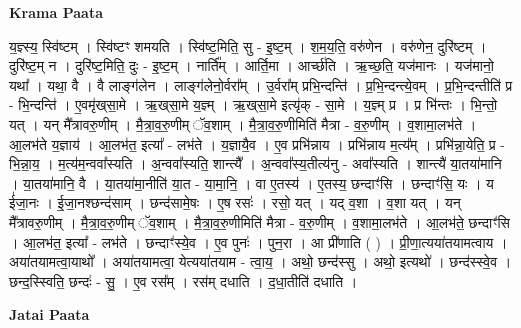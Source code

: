 \documentclass[17pt]{extarticle}
\begin{document}
\textbf{Krama Paata} \newline

य॒ज्ञ्स्य॒ स्वि॑ष्टम् । स्वि॑ष्टꣳ शमयति । स्वि॑ष्ट॒मिति॒ सु - इ॒ष्ट॒म् । श॒म॒य॒ति॒ वरु॑णेन । वरु॑णेन॒ दुरि॑ष्टम् । दुरि॑ष्ट॒म् न । दुरि॑ष्ट॒मिति॒ दुः - इ॒ष्ट॒म् । नार्ति᳚म् । आर्ति॒मा । आर्च्छ॑ति । ऋ॒च्छ॒ति॒ यज॑मानः । यज॑मानो॒ यथा᳚ । यथा॒ वै । वै लाङ्‍ग॑लेन । लाङ्‍ग॑लेनो॒र्वरा᳚म् । उ॒र्वरा᳚म् प्रभि॒न्दन्ति॑ । प्र॒भि॒न्दन्त्ये॒वम् । प्र॒भि॒न्दन्तीति॑ प्र - भि॒न्दन्ति॑ । ए॒वमृ॑ख्‌सा॒मे । ऋ॒ख्‌सा॒मे य॒ज्ञ्म् । ऋ॒ख्‌सा॒मे इत्यृ॑क् - सा॒मे । य॒ज्ञ्म् प्र । प्र भि॑न्तः । भि॒न्तो॒ यत् । यन् मै᳚त्रावरु॒णीम् । मै॒त्रा॒व॒रु॒णीम् ॅव॒शाम् । मै॒त्रा॒व॒रु॒णीमिति॑ मैत्रा - व॒रु॒णीम् । व॒शामा॒लभ॑ते । आ॒लभ॑ते य॒ज्ञाय॑ । आ॒लभ॑त॒ इत्या᳚ - लभ॑ते । य॒ज्ञायै॒व । ए॒व प्रभि॑न्नाय । प्रभि॑न्नाय म॒त्य᳚म् । प्रभि॑न्ना॒येति॒ प्र - भि॒न्ना॒य॒ । म॒त्य॑म॒न्ववा᳚स्यति । अ॒न्ववा᳚स्यति॒ शान्त्यै᳚ । अ॒न्ववा᳚स्य॒तीत्य॑नु - अवा᳚स्यति । शान्त्यै॑ या॒तया॑मानि । या॒तया॑मानि॒ वै । या॒तया॑मा॒नीति॑ या॒त - या॒मा॒नि॒ । वा ए॒तस्य॑ । ए॒तस्य॒ छन्दाꣳ॑सि । छन्दाꣳ॑सि॒ यः । य ई॑जा॒नः । ई॒जा॒नश्छन्द॑साम् । छन्द॑सामे॒षः । ए॒ष रसः॑ । रसो॒ यत् । यद् व॒शा । व॒शा यत् । यन् मै᳚त्रावरु॒णीम् । मै॒त्रा॒व॒रु॒णीम् ॅव॒शाम् । मै॒त्रा॒व॒रु॒णीमिति॑ मैत्रा - व॒रु॒णीम् । व॒शामा॒लभ॑ते । आ॒लभ॑ते॒ छन्दाꣳ॑सि । आ॒लभ॑त॒ इत्या᳚ - लभ॑ते । छन्दाꣳ॑स्ये॒व । ए॒व पुनः॑ । पुन॒रा । आ प्री॑णाति ( ) । प्री॒णा॒त्यया॑तयामत्वाय । अया॑तयामत्वा॒याथो᳚ । अया॑तयामत्वा॒ येत्यया॑तयाम - त्वा॒य॒ । अथो॒ छन्द॑स्सु । अथो॒ इत्यथो॑ । छन्द॑स्स्वे॒व । छन्द॒स्स्विति॒ छन्दः॑ - सु॒ । ए॒व रस᳚म् । रस॑म् दधाति । द॒धा॒तीति॑ दधाति । \newline

\textbf{Jatai Paata} \newline
\end{document}
